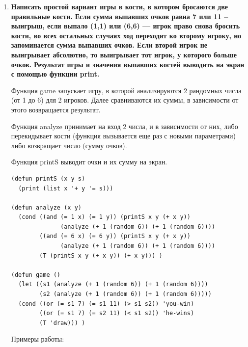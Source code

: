 \documentclass[a4paper,14pt]{extreport} %
\begin{document}
\begin{enumerate}
\begin{lstlisting}
(defun centr (lst)
  (mapcar (lambda (x y) y) (cdr lst) lst))
\end{lstlisting}

Рекурсивно -- пока хвост не Nil, соединяем с помощью cons голову и возвращаем значение функции от хвоста:

\begin{lstlisting}
(defun centr (lst)
  (if (NULL (cadr lst))()(cons (car lst)(centr (cdr lst)))))
\end{lstlisting}

\item \textbf{Написать простой вариант игры в кости, в котором бросаются две правильные кости. Если сумма выпавших очков равна 7 или 11 -- выигрыш, если выпало (1,1) или (6,6) --- игрок право снова бросить кости, во всех остальных случаях ход переходит ко второму игроку, но запоминается сумма выпавших очков. Если второй игрок не выигрывает абсолютно, то выигрывает тот игрок, у которого больше очков. Результат игры и значения выпавших костей выводить на экран с помощью функции print.}

Функция game запускает игру, в которой анализируются 2 рандомных числа (от 1 до 6) для 2 игроков. Далее сравниваются их суммы, в зависимости от этого возвращается результат. 

Функция analyze принимает на вход 2 числа, и в зависимости от них, либо перекидывает кости (функция вызывается еще раз с новыми параметрами) либо возвращает число (сумму очков). 

Функция printS выводит очки и их сумму на экран. 

\begin{lstlisting}
(defun printS (x y s)
  (print (list x '+ y '= s)))

(defun analyze (x y)
  (cond ((and (= 1 x) (= 1 y)) (printS x y (+ x y)) 
    	      (analyze (+ 1 (random 6)) (+ 1 (random 6))))
        ((and (= 6 x) (= 6 y)) (printS x y (+ x y))
    	      (analyze (+ 1 (random 6)) (+ 1 (random 6))))
        (T (printS x y (+ x y)) (+ x y))) )

(defun game ()
  (let ((s1 (analyze (+ 1 (random 6)) (+ 1 (random 6))))
        (s2 (analyze (+ 1 (random 6)) (+ 1 (random 6)))))
  (cond ((or (= s1 7) (= s1 11) (> s1 s2)) 'you-win)
        ((or (= s1 7) (= s2 11) (< s1 s2)) 'he-wins)
        (T 'draw))) )
\end{lstlisting}

\hfill

Примеры работы:


\end{enumerate}
\end{document}
